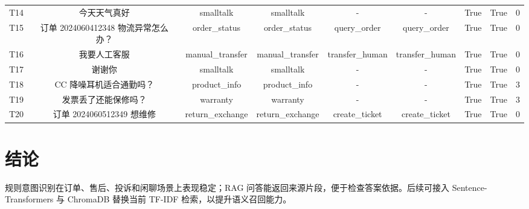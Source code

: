 \documentclass[12pt,a4paper]{ctexart}
\begin{document}
\begin{longtable}{cccccccc}
T14 & 今天天气真好 & smalltalk & smalltalk & - & - & True & True & 0 \\
T15 & 订单 2024060412348 物流异常怎么办？ & order\_status & order\_status & query\_order & query\_order & True & True & 0 \\
T16 & 我要人工客服 & manual\_transfer & manual\_transfer & transfer\_human & transfer\_human & True & True & 0 \\
T17 & 谢谢你 & smalltalk & smalltalk & - & - & True & True & 0 \\
T18 & CC 降噪耳机适合通勤吗？ & product\_info & product\_info & - & - & True & True & 3 \\
T19 & 发票丢了还能保修吗？ & warranty & warranty & - & - & True & True & 3 \\
T20 & 订单 2024060512349 想维修 & return\_exchange & return\_exchange & create\_ticket & create\_ticket & True & True & 0 \\

\end{longtable}

\section{结论}

规则意图识别在订单、售后、投诉和闲聊场景上表现稳定；RAG 问答能返回来源片段，便于检查答案依据。后续可接入 Sentence-Transformers 与 ChromaDB 替换当前 TF-IDF 检索，以提升语义召回能力。
\end{document}
